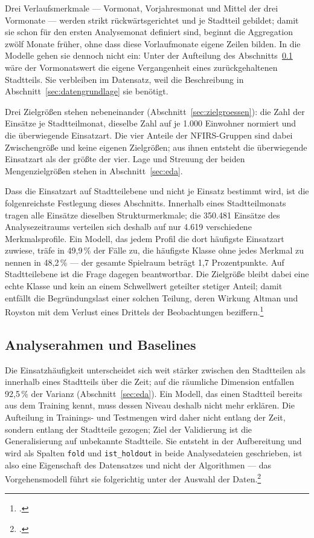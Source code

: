 Drei Verlaufsmerkmale --- Vormonat, Vorjahresmonat und Mittel der drei
Vormonate --- werden strikt rückwärtsgerichtet und je Stadtteil gebildet; damit
sie schon für den ersten Analysemonat definiert sind, beginnt die Aggregation
zwölf Monate früher, ohne dass diese Vorlaufmonate eigene Zeilen bilden. In die
Modelle gehen sie dennoch nicht ein: Unter der Aufteilung des
Abschnitts~\ref{sec:rahmen-baselines} wäre der Vormonatswert die eigene
Vergangenheit eines zurückgehaltenen Stadtteils. Sie verbleiben im Datensatz,
weil die Beschreibung in Abschnitt~\ref{sec:datengrundlage} sie benötigt.

Drei Zielgrößen stehen nebeneinander (Abschnitt~\ref{sec:zielgroessen}): die
Zahl der Einsätze je Stadtteilmonat, dieselbe Zahl auf je 1.000 Einwohner
normiert und die überwiegende Einsatzart. Die vier Anteile der NFIRS-Gruppen
sind dabei Zwischengröße und keine eigenen Zielgrößen; aus ihnen entsteht die
überwiegende Einsatzart als der größte der vier. Lage und Streuung der beiden
Mengenzielgrößen stehen in Abschnitt~\ref{sec:eda}.

Dass die Einsatzart auf Stadtteilebene und nicht je Einsatz bestimmt wird, ist
die folgenreichste Festlegung dieses Abschnitts. Innerhalb eines
Stadtteilmonats tragen alle Einsätze dieselben Strukturmerkmale; die 350.481
Einsätze des Analysezeitraums verteilen sich deshalb auf nur 4.619 verschiedene
Merkmalsprofile. Ein Modell, das jedem Profil die dort häufigste Einsatzart
zuwiese, träfe in 49,9\,\% der Fälle zu, die häufigste Klasse ohne jedes
Merkmal zu nennen in 48,2\,\% --- der gesamte Spielraum beträgt 1,7
Prozentpunkte. Auf Stadtteilebene ist die Frage dagegen beantwortbar. Die
Zielgröße bleibt dabei eine echte Klasse und kein an einem Schwellwert
geteilter stetiger Anteil; damit entfällt die Begründungslast einer solchen
Teilung, deren Wirkung Altman und Royston mit dem Verlust eines Drittels der
Beobachtungen beziffern.\footcite{Altman2006}



\subsection{Analyserahmen und Baselines}
\label{sec:rahmen-baselines}

Die Einsatzhäufigkeit unterscheidet sich weit stärker zwischen den Stadtteilen
als innerhalb eines Stadtteils über die Zeit; auf die räumliche Dimension
entfallen 92,5\,\% der Varianz (Abschnitt~\ref{sec:eda}). Ein Modell, das einen
Stadtteil bereits aus dem Training kennt, muss dessen Niveau deshalb nicht mehr
erklären. Die Aufteilung in Trainings- und Testmengen wird daher nicht entlang
der Zeit, sondern entlang der Stadtteile gezogen; Ziel der Validierung ist die
Generalisierung auf unbekannte Stadtteile. Sie entsteht in der Aufbereitung und
wird als Spalten \texttt{fold} und \texttt{ist\_holdout} in beide
Analysedateien geschrieben, ist also eine Eigenschaft des Datensatzes und nicht
der Algorithmen --- das Vorgehensmodell führt sie folgerichtig unter der
Auswahl der Daten.\footcite[23-26]{Chapman2000}


